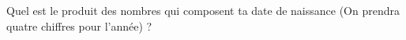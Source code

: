 Quel est le produit des nombres qui composent ta date de naissance (On
 prendra quatre chiffres pour l'année) ?

